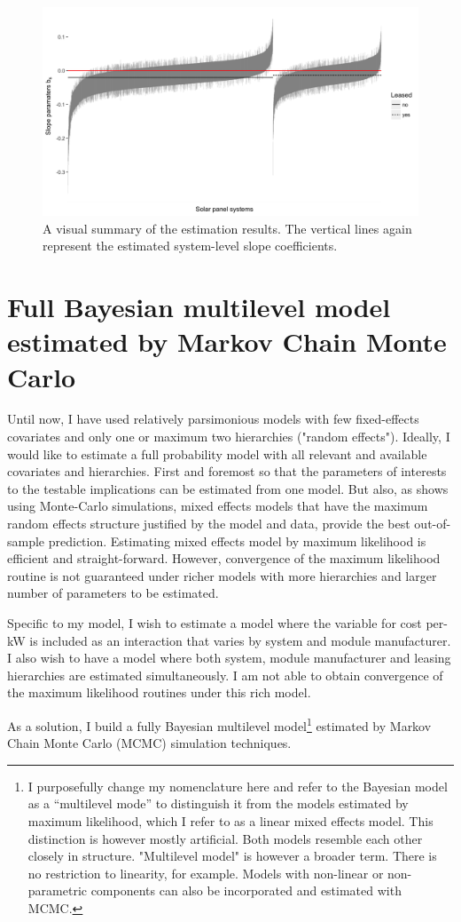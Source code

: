\documentclass[12pt]{article}
\begin{document}
\begin{figure}
  \centering
	\includegraphics[width=.8\textwidth]{figures/lease_sys_fig.png}
	\caption{A visual summary of the estimation results. The vertical lines again represent the estimated system-level slope coefficients.}
	\label{lease_sys_fig}
\end{figure}

\section{Full Bayesian multilevel model estimated by Markov Chain Monte Carlo}
Until now, I have used relatively parsimonious models with few fixed-effects covariates and only one or maximum two hierarchies ("random effects").  Ideally, I would like to estimate a full probability model with all relevant and available covariates and hierarchies. First and foremost so that the parameters of interests to the testable implications can be estimated from one model. But also, as \citet{barr_random_2013} shows using Monte-Carlo simulations, mixed effects models that have the maximum random effects structure justified by the model and data, provide the best out-of-sample prediction. Estimating mixed effects model by maximum likelihood is efficient and straight-forward. However, convergence of the maximum likelihood routine is not guaranteed under richer models with more hierarchies and larger number of parameters to be estimated.

Specific to my model, I wish to estimate a model where the variable for cost per-kW is included as an interaction that varies by system and module manufacturer. I also wish to have a model where both system, module manufacturer and leasing hierarchies are estimated simultaneously. I am not able to obtain convergence of the maximum likelihood routines under this rich model.

As a solution, I build a fully Bayesian multilevel model\footnote{I purposefully change my nomenclature here and refer to the Bayesian model as a ``multilevel mode'' to distinguish it from the models estimated by maximum likelihood, which I refer to as a linear mixed effects model. This distinction is however mostly artificial. Both models resemble each other closely in structure. "Multilevel model" is however a broader term. There is no restriction to linearity, for example. Models with non-linear or non-parametric components can also be incorporated and estimated with MCMC.} estimated by Markov Chain Monte Carlo (MCMC) simulation techniques.
\end{document}
